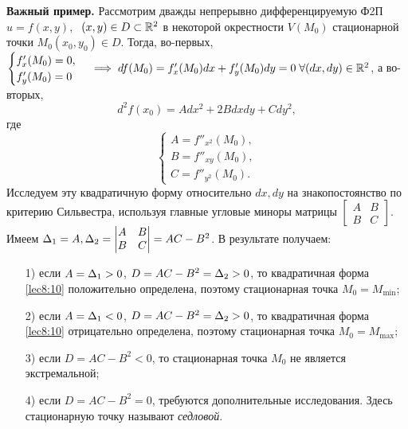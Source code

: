 \documentclass[../../main.tex]{subfiles}
\begin{document}
    \noindent
    \textbf{Важный пример.}
        Рассмотрим дважды непрерывно дифференцируемую Ф2П $u = f(x, y), \;$
        $(x, y) \in D \subset \mathbb{R}^2$ в некоторой окрестности $V(M_0)$
        стационарной точки $M_0 (x_0, y_0) \in D$. Тогда, во-первых,
        $\begin{cases}
            f'_x(M_0) = 0, \\
            f'_y(M_0) = 0
        \end{cases}
        \implies df(M_0) = f'_x(M_0)dx + f'_y(M_0)dy = 0 \; \forall(dx, dy)
        \in \mathbb{R}^2$, а во-вторых,
        \begin{equation}
            d^2f(x_0) = Adx^2 + 2Bdxdy + Cdy^2,
            \label{lec8:10}
        \end{equation}
        где
        \[\begin{cases}
            A = f''_{x^2}(M_0), \\
            B = f''_{xy}(M_0), \\
            C = f''_{y^2}(M_0).
        \end{cases}\]
        Исследуем эту квадратичную форму относительно $dx, dy$ на
        знакопостоянство по критерию Сильвестра, используя главные угловые
        миноры матрицы
        $\begin{bmatrix}
            A & B \\
            B & C
        \end{bmatrix}$.
        Имеем $\Delta_1 = A, \Delta_2 =
        \begin{vmatrix}
            A & B \\
            B & C
        \end{vmatrix}
        = AC - B^2$. В результате получаем:
        \begin{itemize}
            \item[1)] если $A = \Delta_1 > 0$, $D = AC-B^2 = \Delta_2 > 0$, то
            квадратичная форма \eqref{lec8:10} положительно определена,
            поэтому стационарная точка $M_0 = M_{\min}$;
            \item[2)] если $A = \Delta_1 < 0$, $D = AC-B^2 = \Delta_2 > 0$, то
            квадратичная форма \eqref{lec8:10} отрицательно определена,
            поэтому стационарная точка $M_0 = M_{\max}$;
            \item[3)] если $D = AC - B^2 < 0$, то стационарная точка $M_0$ не
            является экстремальной;
            \item[4)] если $D = AC - B^2 = 0$, требуются дополнительные
            исследования. Здесь стационарную точку называют \emph{седловой}.
        \end{itemize}
\end{document}
